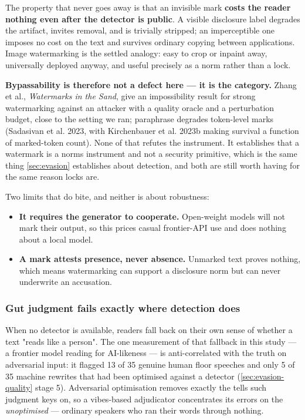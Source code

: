 The property that never goes away is that an invisible mark \textbf{costs the reader
nothing even after the detector is public}. A visible disclosure label
degrades the artifact, invites removal, and is trivially stripped; an
imperceptible one imposes no cost on the text and survives ordinary copying
between applications. Image watermarking is the settled analogy: easy to crop
or inpaint away, universally deployed anyway, and useful precisely as a norm
rather than a lock.

\textbf{Bypassability is therefore not a defect here --- it is the category.} Zhang
et al., \emph{Watermarks in the Sand}, give an impossibility result for strong
watermarking against an attacker with a quality oracle and a perturbation
budget, close to the setting we ran; paraphrase degrades token-level marks
(Sadasivan et al. 2023, with Kirchenbauer et al. 2023b making survival a
function of marked-token count). None of that refutes the instrument. It
establishes that a watermark is a norms instrument and not a security
primitive, which is the same thing \cref{sec:evasion} establishes about detection, and both
are still worth having for the same reason locks are.

Two limits that do bite, and neither is about robustness:

\begin{itemize}
\tightlist
\item
  \textbf{It requires the generator to cooperate.} Open-weight models will not mark
  their output, so this prices casual frontier-API use and does nothing about a
  local model.
\item
  \textbf{A mark attests presence, never absence.} Unmarked text proves nothing,
  which means watermarking can support a disclosure norm but can never
  underwrite an accusation.
\end{itemize}

\subsubsection{Gut judgment fails exactly where detection does}\label{sec:gut-judgment}

When no detector is available, readers fall back on their own sense of whether a text "reads like a person". The one measurement of that fallback in this study --- a frontier model reading for AI-likeness --- is anti-correlated with the truth on adversarial input: it flagged 13 of 35 genuine human floor speeches and only 5 of 35 machine rewrites that had been optimised against a detector (\cref{sec:evasion-quality} stage 5). Adversarial optimisation removes exactly the tells such judgment keys on, so a vibes-based adjudicator concentrates its errors on the \emph{unoptimised} --- ordinary speakers who ran their words through nothing.

